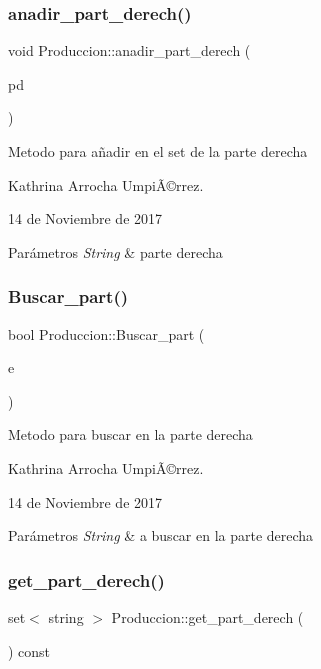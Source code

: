 \subsubsection{\texorpdfstring{anadir\+\_\+part\+\_\+derech()}{anadir\_part\_derech()}}
{\footnotesize\ttfamily void Produccion\+::anadir\+\_\+part\+\_\+derech (\begin{DoxyParamCaption}\item[{string}]{pd }\end{DoxyParamCaption})}

Metodo para añadir en el set de la parte derecha

Kathrina Arrocha UmpiÃ©rrez.

14 de Noviembre de 2017


\begin{DoxyParams}{Parámetros}
{\em String} & parte derecha \\
\hline
\end{DoxyParams}
\mbox{\label{class_produccion_a2192f45a1caead0e79d9a043cf22bc10}} 
\subsubsection{\texorpdfstring{Buscar\+\_\+part()}{Buscar\_part()}}
{\footnotesize\ttfamily bool Produccion\+::\+Buscar\+\_\+part (\begin{DoxyParamCaption}\item[{string}]{e }\end{DoxyParamCaption})}

Metodo para buscar en la parte derecha

Kathrina Arrocha UmpiÃ©rrez.

14 de Noviembre de 2017 
\begin{DoxyParams}{Parámetros}
{\em String} & a buscar en la parte derecha \\
\hline
\end{DoxyParams}
\mbox{\label{class_produccion_abc0510dbd1ebecee94737417b9735414}} 
\subsubsection{\texorpdfstring{get\+\_\+part\+\_\+derech()}{get\_part\_derech()}}
{\footnotesize\ttfamily set$<$ string $>$ Produccion\+::get\+\_\+part\+\_\+derech (\begin{DoxyParamCaption}{ }\end{DoxyParamCaption}) const}

